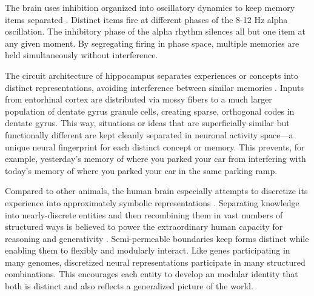 \documentclass[11pt]{article}
\begin{document}

The brain uses inhibition organized into oscillatory dynamics to keep memory items separated \citep{lisman2013theta, jensen2010shaping, roux2014working, klimesch2007eeg}. Distinct items fire at different phases of the 8-12 Hz alpha oscillation. The inhibitory phase of the alpha rhythm silences all but one item at any given moment. By segregating firing in phase space, multiple memories are held simultaneously without interference. 

The circuit architecture of hippocampus separates experiences or concepts into distinct representations, avoiding interference between similar memories \citep{mcclelland1995why, marr1971simple, mcnaughton1987hippocampal, treves1994computational, muller1987effects, leutgeb2007pattern, colgin2008frequency}. Inputs from entorhinal cortex are distributed via mossy fibers to a much larger population of dentate gyrus granule cells, creating sparse, orthogonal codes in dentate gyrus. This way, situations or ideas that are superficially similar but functionally different are kept cleanly separated in neuronal activity space---a unique neural fingerprint for each distinct concept or memory. This prevents, for example, yesterday's memory of where you parked your car from interfering with today's memory of where you parked your car in the same parking ramp. 

Compared to other animals, the human brain especially attempts to discretize its experience into approximately symbolic representations \citep{dehaene2022symbols, touretzky1988distributed, smolensky1990tensor, behrens2018cognitive}. Separating knowledge into nearly-discrete entities and then recombining them in vast numbers of structured ways is believed to power the extraordinary human capacity for reasoning and generativity \citep{fodor1975language, pinker1994language, lake2015human, chomsky1957syntactic, kurth2023replay, schacter2007remembering}. Semi-permeable boundaries keep forms distinct while enabling them to flexibly and modularly interact. Like genes participating in many genomes, discretized neural representations participate in many structured combinations. This encourages each entity to develop an modular identity that both is distinct and also reflects a generalized picture of the world.
\end{document}

